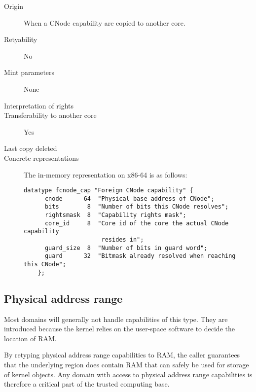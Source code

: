 \begin{description}
\item[Origin] When a CNode capability are copied to another core.

\item[Retyability] No

\item[Mint parameters] None
  
\item[Interpretation of rights] 
  
\item[Transferability to another core] Yes

\item[Last copy deleted] 
  
\item[Concrete representations] The in-memory representation on x86-64 is as follows:
  
  \begin{lstlisting}[language=Mackerel]
    datatype fcnode_cap "Foreign CNode capability" {
      cnode      64  "Physical base address of CNode";
      bits        8  "Number of bits this CNode resolves";
      rightsmask  8  "Capability rights mask";
      core_id     8  "Core id of the core the actual CNode capability
                      resides in";
      guard_size  8  "Number of bits in guard word";
      guard      32  "Bitmask already resolved when reaching this CNode";
    };
  \end{lstlisting}
\end{description}


\subsection{Physical address range}

Most domains will generally not handle capabilities of this type.
They are introduced because the kernel relies on the user-space
software to decide the location of RAM.

By retyping physical address range capabilities to RAM, the caller
guarantees that the underlying region does contain RAM that can safely
be used for storage of kernel objects.  Any domain with access to
physical address range capabilities is therefore a critical part of
the trusted computing base.

